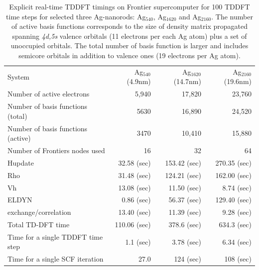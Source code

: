 \documentclass[journal=jctcce,manuscript=article,etalmode=truncate,maxauthors=10,layout=twocolumn,9pt]{achemso}   %
\begin{document}
\begin{table}[h!]
    \centering \footnotesize
    \begin{tabular}{l|r|r|r}
    \hline \hline
System                            &  Ag$_{540}$ (4.9nm)  & Ag$_{1620}$  (14.7nm)  & Ag$_{2160}$ (19.6nm)   \\ 
Number of active electrons        &     5,940     &  17,820        &  23,760        \\

Number of basis functions (total)  &   5630          &  16,890       &  24,520          \\
Number of basis functions (active) &   3470          &  10,410       &  15,880          \\
Number of Frontiers nodes used    &    16         &  32            & 64             \\ \hline
Hupdate                           &   32.58 (sec) &  153.42 (sec)  & 270.35 (sec)    \\
Rho                               &   31.48 (sec) &  124.21 (sec)  & 162.00 (sec)   \\
Vh                                &   13.08 (sec) &   11.50 (sec)  & 8.74 (sec)   \\
ELDYN                             &    0.86 (sec) &   56.37 (sec)  & 129.40 (sec)   \\
exchange/correlation              &   13.40 (sec) &   11.39 (sec)  & 9.28 (sec)     \\
Total TD-DFT time                 &  110.06 (sec) &  378.6 (sec)   & 634.3 (sec)    \\    
\hline
Time for a single TDDFT time step &    1.1 (sec)  &  3.78 (sec)    & 6.34 (sec)    \\
Time for a single  SCF iteration  & 27.0          &   124 (sec)    & 108 (sec)     \\ 
\hline\hline 
    \end{tabular}
    \caption{ \footnotesize  Explicit real-time TDDFT timings  on  Frontier supercomputer for 100 TDDFT time steps for selected three Ag-nanorods: Ag$_{540}$, Ag$_{1620}$ and  Ag$_{2160}$. The number of active basis functions corresponds to the size of  density matrix propagated spanning \emph{4d,5s} valence orbitals  (11 electrons per each Ag atom)  plus a  set of unoccupied orbitals. The total number of basis function is larger and includes  semicore orbitals in addition to valence ones (19 electrons per Ag atom).}
    \label{tab:Frontier-timing}
\end{table}
\end{document}
